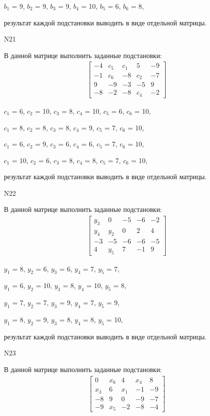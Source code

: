 \documentclass[11pt]{report}
\begin{document}
$b_{1}$ = 9, $b_{2}$ = 9, $b_{3}$ = 9, $b_{4}$ = 10, $b_{5}$ = 6, $b_{6}$ = 8, 

результат каждой подстановки выводить в виде отдельной матрицы.

N21

В данной матрице выполнить заданные подстановки:
\begin{align*}
\left[\begin{matrix}-4 & c_{5} & c_{1} & 5 & -9\\-1 & c_{6} & -8 & c_{2} & -7\\9 & -9 & -3 & -5 & 9\\-8 & -2 & -8 & c_{4} & -2\end{matrix}\right]
\end{align*}


$c_{1}$ = 6, $c_{2}$ = 10, $c_{3}$ = 8, $c_{4}$ = 10, $c_{5}$ = 6, $c_{6}$ = 10, 

$c_{1}$ = 8, $c_{2}$ = 8, $c_{3}$ = 8, $c_{4}$ = 9, $c_{5}$ = 7, $c_{6}$ = 10, 

$c_{1}$ = 6, $c_{2}$ = 9, $c_{3}$ = 6, $c_{4}$ = 6, $c_{5}$ = 7, $c_{6}$ = 10, 

$c_{1}$ = 10, $c_{2}$ = 6, $c_{3}$ = 8, $c_{4}$ = 8, $c_{5}$ = 7, $c_{6}$ = 10, 

результат каждой подстановки выводить в виде отдельной матрицы.

N22

В данной матрице выполнить заданные подстановки:
\begin{align*}
\left[\begin{matrix}y_{3} & 0 & -5 & -6 & -2\\y_{4} & y_{2} & 0 & 2 & 4\\-3 & -5 & -6 & -6 & -5\\4 & y_{5} & 7 & -1 & 9\end{matrix}\right]
\end{align*}


$y_{1}$ = 8, $y_{2}$ = 6, $y_{3}$ = 6, $y_{4}$ = 7, $y_{5}$ = 7, 

$y_{1}$ = 6, $y_{2}$ = 10, $y_{3}$ = 8, $y_{4}$ = 10, $y_{5}$ = 8, 

$y_{1}$ = 7, $y_{2}$ = 7, $y_{3}$ = 9, $y_{4}$ = 7, $y_{5}$ = 9, 

$y_{1}$ = 8, $y_{2}$ = 9, $y_{3}$ = 8, $y_{4}$ = 8, $y_{5}$ = 10, 

результат каждой подстановки выводить в виде отдельной матрицы.

N23

В данной матрице выполнить заданные подстановки:
\begin{align*}
\left[\begin{matrix}0 & x_{6} & 4 & x_{4} & 8\\x_{3} & 6 & x_{1} & -1 & -9\\-8 & 9 & 0 & -9 & -7\\-9 & x_{5} & -2 & -8 & -4\end{matrix}\right]
\end{align*}
\end{document}
